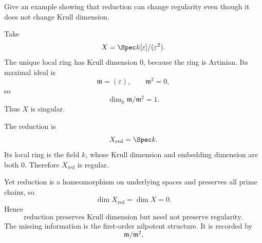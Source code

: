 \begin{problem}\label{prob:vi32-18}
Give an example showing that reduction can change regularity even though it does not change Krull dimension.

\end{problem}

\ifdefined\FullProblemDossiers
\begin{solution}
Take
\[
X=\Spec k[\varepsilon]/(\varepsilon^2).
\]
The unique local ring has Krull dimension \(0\), because the ring is Artinian. Its maximal ideal is
\[
\mathfrak m=(\varepsilon),
\qquad
\mathfrak m^2=0,
\]
so
\[
\dim_k\mathfrak m/\mathfrak m^2=1.
\]
Thus \(X\) is singular.

The reduction is
\[
X_{\mathrm{red}}
=
\Spec k.
\]
Its local ring is the field \(k\), whose Krull dimension and embedding dimension are both \(0\). Therefore
\(X_{\mathrm{red}}\) is regular.

Yet reduction is a homeomorphism on underlying spaces and preserves all prime chains, so
\[
\dim X_{\mathrm{red}}=\dim X=0.
\]
Hence
\[
\boxed{\text{reduction preserves Krull dimension but need not preserve regularity}.}
\]
The missing information is the first-order nilpotent structure.  It is recorded by
\[
\mathfrak m/\mathfrak m^2.
\]
\end{solution}
\fi
